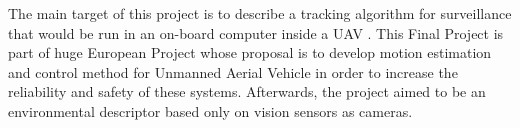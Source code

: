 

The main target of this project is to describe a tracking algorithm for surveillance that would be run in an on-board computer inside a UAV \cite{Image_processing_UAV}.  This Final Project is part of huge European Project whose proposal is to develop motion estimation and control method for Unmanned Aerial Vehicle in order to increase the reliability and safety of these systems. Afterwards, the project aimed to be an environmental descriptor based only on vision sensors as cameras. \\


 
